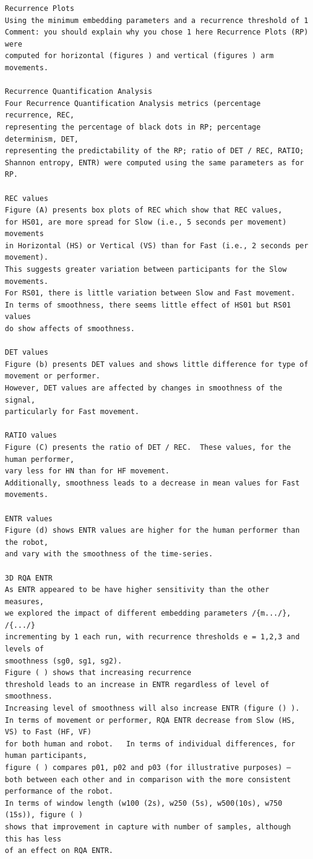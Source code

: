 \documentclass[10pt]{article}
\begin{document}
\begin{verbatim}
Recurrence Plots
Using the minimum embedding parameters and a recurrence threshold of 1 
Comment: you should explain why you chose 1 here Recurrence Plots (RP) were 
computed for horizontal (figures ) and vertical (figures ) arm movements.

Recurrence Quantification Analysis
Four Recurrence Quantification Analysis metrics (percentage recurrence, REC, 
representing the percentage of black dots in RP; percentage determinism, DET, 
representing the predictability of the RP; ratio of DET / REC, RATIO; 
Shannon entropy, ENTR) were computed using the same parameters as for RP.

REC values
Figure (A) presents box plots of REC which show that REC values, 
for HS01, are more spread for Slow (i.e., 5 seconds per movement) movements 
in Horizontal (HS) or Vertical (VS) than for Fast (i.e., 2 seconds per movement).  
This suggests greater variation between participants for the Slow movements.  
For RS01, there is little variation between Slow and Fast movement.  
In terms of smoothness, there seems little effect of HS01 but RS01 values 
do show affects of smoothness.

DET values
Figure (b) presents DET values and shows little difference for type of movement or performer.  
However, DET values are affected by changes in smoothness of the signal, 
particularly for Fast movement.

RATIO values
Figure (C) presents the ratio of DET / REC.  These values, for the human performer, 
vary less for HN than for HF movement.  
Additionally, smoothness leads to a decrease in mean values for Fast movements.

ENTR values
Figure (d) shows ENTR values are higher for the human performer than the robot, 
and vary with the smoothness of the time-series.

3D RQA ENTR
As ENTR appeared to be have higher sensitivity than the other measures, 
we explored the impact of different embedding parameters /{m.../}, /{.../} 
incrementing by 1 each run, with recurrence thresholds e = 1,2,3 and levels of 
smoothness (sg0, sg1, sg2).  
Figure ( ) shows that increasing recurrence 
threshold leads to an increase in ENTR regardless of level of smoothness.  
Increasing level of smoothness will also increase ENTR (figure () ).  
In terms of movement or performer, RQA ENTR decrease from Slow (HS, VS) to Fast (HF, VF) 
for both human and robot.   In terms of individual differences, for human participants, 
figure ( ) compares p01, p02 and p03 (for illustrative purposes) – 
both between each other and in comparison with the more consistent performance of the robot.  
In terms of window length (w100 (2s), w250 (5s), w500(10s), w750 (15s)), figure ( ) 
shows that improvement in capture with number of samples, although this has less 
of an effect on RQA ENTR.

\end{verbatim}
\end{document}
